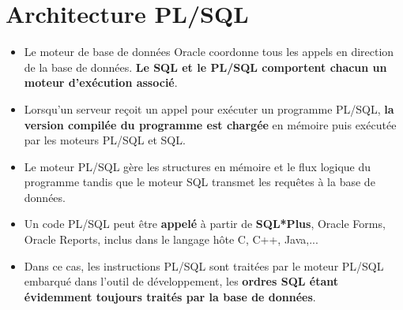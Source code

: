 \documentclass[10pt]{beamer}
\begin{document}
\section{Architecture PL/SQL}
\begin{frame}{\secname}
    \begin{itemize}
        \item Le moteur de base de données Oracle coordonne tous les appels en direction de la base de données. \textbf{Le SQL et le PL/SQL comportent chacun un moteur d'exécution associé}.
        \item Lorsqu'un serveur reçoit un appel pour exécuter un programme PL/SQL, \textbf{la version compilée du programme est chargée} en mémoire puis exécutée par les moteurs PL/SQL et SQL.
        \item Le moteur PL/SQL gère les structures en mémoire et le flux logique du programme tandis que le moteur SQL transmet les requêtes à la base de données.
    \end{itemize}
\end{frame}

\begin{frame}{\secname}
    \begin{itemize}
        \item Un code PL/SQL peut être \textbf{appelé} à partir de \textbf{SQL*Plus}, Oracle Forms, Oracle Reports, inclus dans le langage hôte C, C++, Java,...
        \item Dans ce cas, les instructions PL/SQL sont traitées par le moteur PL/SQL embarqué dans l'outil de développement, les \textbf{ordres SQL étant évidemment toujours traités par la base de données}.
    \end{itemize}
\end{frame}
\end{document}
